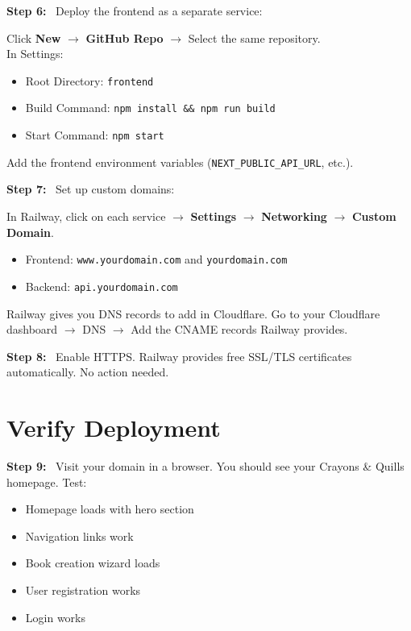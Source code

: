 \documentclass[12pt, letterpaper, oneside]{book}
\newcommand{\step}[1]{\noindent\textbf{\textcolor{primary}{Step #1:}}~}
\begin{document}
\step{6} Deploy the frontend as a separate service:
\begin{actionbox}
Click \textbf{New} $\rightarrow$ \textbf{GitHub Repo} $\rightarrow$ Select the same repository.\\
In Settings:
\begin{itemize}[leftmargin=1.5em]
  \item Root Directory: \texttt{frontend}
  \item Build Command: \texttt{npm install \&\& npm run build}
  \item Start Command: \texttt{npm start}
\end{itemize}
Add the frontend environment variables (\texttt{NEXT\_PUBLIC\_API\_URL}, etc.).
\end{actionbox}

\step{7} Set up custom domains:
\begin{actionbox}
In Railway, click on each service $\rightarrow$ \textbf{Settings} $\rightarrow$ \textbf{Networking} $\rightarrow$ \textbf{Custom Domain}.\\[4pt]
\begin{itemize}[leftmargin=1.5em]
  \item Frontend: \texttt{www.yourdomain.com} and \texttt{yourdomain.com}
  \item Backend: \texttt{api.yourdomain.com}
\end{itemize}
Railway gives you DNS records to add in Cloudflare. Go to your Cloudflare dashboard $\rightarrow$ DNS $\rightarrow$ Add the CNAME records Railway provides.
\end{actionbox}

\step{8} Enable HTTPS. Railway provides free SSL/TLS certificates automatically. No action needed.

\section{Verify Deployment}

\step{9} Visit your domain in a browser. You should see your Crayons \& Quills homepage. Test:
\begin{itemize}[leftmargin=2em]
  \item[$\square$] Homepage loads with hero section
  \item[$\square$] Navigation links work
  \item[$\square$] Book creation wizard loads
  \item[$\square$] User registration works
  \item[$\square$] Login works
\end{itemize}
\end{document}
